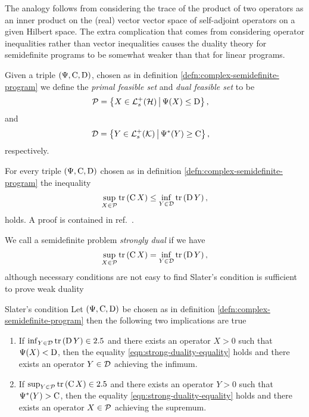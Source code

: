 The analogy follows from considering the trace of the product of two operators as an inner product on the (real) vector vector space of self-adjoint operators on a given Hilbert space. The extra complication that comes from considering operator inequalities rather than vector inequalities causes the duality theory for semidefinite programs to be somewhat weaker than that for linear programs.

\begin{defn}\label{defn:semidefinite-feasible-sets}
  Given a triple $\left(\Psi, \operatorname{C}, \operatorname{D}\right)$, chosen as in definition \ref{defn:complex-semidefinite-program} we define the \emph{primal feasible set} and \emph{dual feasible set} to be
  \begin{align}
    \pcal &= \sbuild{X\in\posops[\hcal]}{\Psi(X)\leq \opd},
  \end{align}
  and
  \begin{align}
    \dcal &= \sbuild{Y\in\posops[\kcal]}{\Psi^*(Y)\geq \opc},
  \end{align}
  respectively.
\end{defn}

\begin{thm}\label{thm:weak-duality-semidefinite-prog}
  For every triple $\left(\Psi, \operatorname{C}, \operatorname{D}\right)$ chosen as in definition \ref{defn:complex-semidefinite-program} the inequality
  \begin{align}
    \sup_{X\in\mathcal{P}} \operatorname{tr}\left( \operatorname{C} X \right) \leq \inf_{Y\in\mathcal{D}} \operatorname{tr}\left( \operatorname{D} Y \right),
  \end{align}
  holds. A proof is contained in ref.~\cite{Vandenberghe-Boyd-semidefinite}.
\end{thm}

We call a semidefinite problem \emph{strongly dual} if we have
\begin{align}\label{eqn:strong-duality-equality}
  \sup_{X\in\mathcal{P}} \operatorname{tr}\left( \operatorname{C} X \right) = \inf_{Y\in\mathcal{D}} \operatorname{tr}\left( \operatorname{D} Y \right),
\end{align}
although necessary conditions are not easy to find Slater's condition  is sufficient to prove weak duality
\begin{thm}{Slater's condition}\label{eqn:slaters-condition-sufficient}
  Let $\left(\Psi, \operatorname{C}, \operatorname{D}\right)$ be chosen as in definition \ref{defn:complex-semidefinite-program} then the following two implications are true
  \begin{enumerate}
  \item If $\inf_{Y\in\mathcal{D}} \operatorname{tr}\left( \operatorname{D} Y \right) \in2.5$ and there exists an operator $X> 0$ such that $\Psi(X) < \operatorname{D}$, then the equality \eqref{eqn:strong-duality-equality} holds and there exists an operator $Y\in\mathcal{D}$ achieving the infimum.
  \item If $\sup_{Y\in\mathcal{P}} \operatorname{tr}\left( \operatorname{C} X \right) \in2.5$ and there exists an operator $Y> 0$ such that $\Psi^*(Y) > \operatorname{C}$, then the equality \eqref{eqn:strong-duality-equality} holds and there exists an operator $X\in\mathcal{P}$ achieving the supremum.
  \end{enumerate}
\end{thm}

